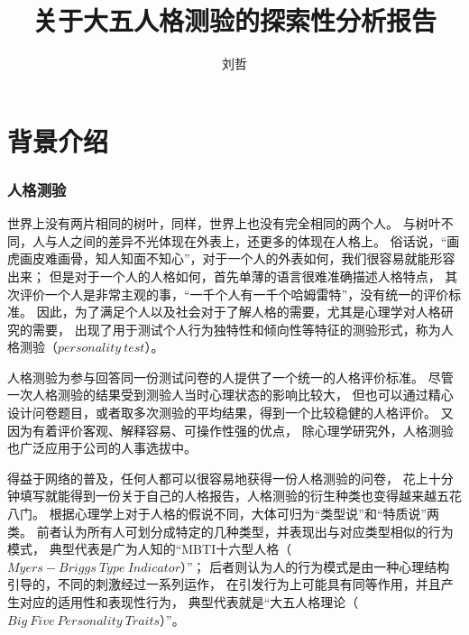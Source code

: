 \documentclass[UTF8]{ctexart}
\begin{document}
\title{关于大五人格测验的探索性分析报告}
\author{刘哲}
\maketitle
\part{背景介绍}
\section{人格测验}
世界上没有两片相同的树叶，同样，世界上也没有完全相同的两个人。
与树叶不同，人与人之间的差异不光体现在外表上，还更多的体现在人格上。
俗话说，“画虎画皮难画骨，知人知面不知心”，对于一个人的外表如何，我们很容易就能形容出来；
但是对于一个人的人格如何，首先单薄的语言很难准确描述人格特点，
其次评价一个人是非常主观的事，“一千个人有一千个哈姆雷特”，没有统一的评价标准。
因此，为了满足个人以及社会对于了解人格的需要，尤其是心理学对人格研究的需要，
出现了用于测试个人行为独特性和倾向性等特征的测验形式，称为人格测验（$personality\ test$）。\par
人格测验为参与回答同一份测试问卷的人提供了一个统一的人格评价标准。
尽管一次人格测验的结果受到测验人当时心理状态的影响比较大，
但也可以通过精心设计问卷题目，或者取多次测验的平均结果，得到一个比较稳健的人格评价。
又因为有着评价客观、解释容易、可操作性强的优点，
除心理学研究外，人格测验也广泛应用于公司的人事选拔中。\par
得益于网络的普及，任何人都可以很容易地获得一份人格测验的问卷，
花上十分钟填写就能得到一份关于自己的人格报告，人格测验的衍生种类也变得越来越五花八门。
根据心理学上对于人格的假说不同，大体可归为“类型说”和“特质说”两类。
前者认为所有人可划分成特定的几种类型，并表现出与对应类型相似的行为模式，
典型代表是广为人知的“MBTI十六型人格（$Myers-Briggs\ Type\ Indicator$）”；
后者则认为人的行为模式是由一种心理结构引导的，不同的刺激经过一系列运作，
在引发行为上可能具有同等作用，并且产生对应的适用性和表现性行为，
典型代表就是“大五人格理论（$Big\ Five\ Personality\ Traits$）”。
\end{document}
